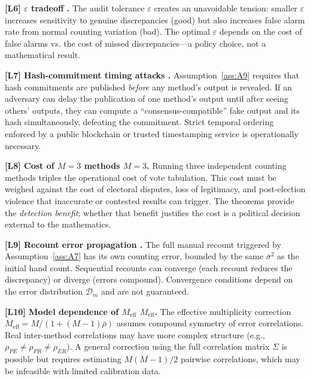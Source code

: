 \documentclass[11pt,a4paper]{article}
\theoremstyle{definition}
\newcommand{\limitationTag}[1]{\textsf{\textbf{[L#1]}}}
\begin{document}
\begin{enumerate}[label=\limitationTag{\arabic*},leftmargin=*]
    \item \textbf{\limitationTag{6} $\varepsilon$ tradeoff .} The audit tolerance $\varepsilon$ creates an unavoidable tension: smaller $\varepsilon$ increases sensitivity to genuine discrepancies (good) but also increases false alarm rate from normal counting variation (bad). The optimal $\varepsilon$ depends on the cost of false alarms vs. the cost of missed discrepancies---a policy choice, not a mathematical result.
    \item \textbf{\limitationTag{7} Hash-commitment timing attacks .} Assumption~\ref{ass:A9} requires that hash commitments are published \textit{before} any method's output is revealed. If an adversary can delay the publication of one method's output until after seeing others' outputs, they can compute a ``consensus-compatible'' fake output and its hash simultaneously, defeating the commitment. Strict temporal ordering enforced by a public blockchain or trusted timestamping service is operationally necessary.
    \item \textbf{\limitationTag{8} Cost of $M = 3$ methods $M=3$.} Running three independent counting methods triples the operational cost of vote tabulation. This cost must be weighed against the cost of electoral disputes, loss of legitimacy, and post-election violence that inaccurate or contested results can trigger. The theorems provide the \textit{detection benefit}; whether that benefit justifies the cost is a political decision external to the mathematics.
    \item \textbf{\limitationTag{9} Recount error propagation .} The full manual recount triggered by Assumption~\ref{ass:A7} has its own counting error, bounded by the same $\bar{\sigma}^2$ as the initial hand count. Sequential recounts can converge (each recount reduces the discrepancy) or diverge (errors compound). Convergence conditions depend on the error distribution $\mathcal{D}_m$ and are not guaranteed.
    \item \textbf{\limitationTag{10} Model dependence of $M_{\text{eff}}$ $M_{\text{eff}}$.} The effective multiplicity correction $M_{\text{eff}} = M / (1 + (M-1)\bar{\rho})$ assumes compound symmetry of error correlations. Real inter-method correlations may have more complex structure (e.g., $\rho_{PE} \neq \rho_{PR} \neq \rho_{ER}$). A general correction using the full correlation matrix $\Sigma$ is possible but requires estimating $M(M-1)/2$ pairwise correlations, which may be infeasible with limited calibration data.
\end{enumerate}
\end{document}
